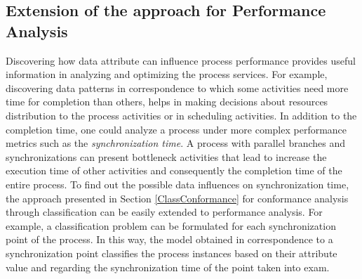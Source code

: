 \documentclass{llncs}
\begin{document}
\subsection{Extension of the approach for Performance Analysis}\label{ClassPerf}
Discovering how data attribute can influence process performance provides useful information in analyzing and optimizing the process services. For example, discovering data patterns in correspondence to which some activities need more time for completion than others, helps in making decisions about resources distribution to the process activities or in scheduling activities. In addition to the completion time, one could analyze a process under more complex performance metrics such as the \emph{synchronization time}. A process with parallel branches and synchronizations can present bottleneck activities that lead to increase the execution time of other activities and consequently the completion time of the entire process. To find out the possible data influences on synchronization time, the approach presented in Section \ref{ClassConformance} for conformance analysis through classification can be easily extended to performance analysis. For example, a classification problem can be formulated for each synchronization point of the process. In this way, the model obtained in correspondence to a synchronization point classifies the process instances based on their attribute value and regarding the synchronization time of the point taken into exam. 
\end{document}
